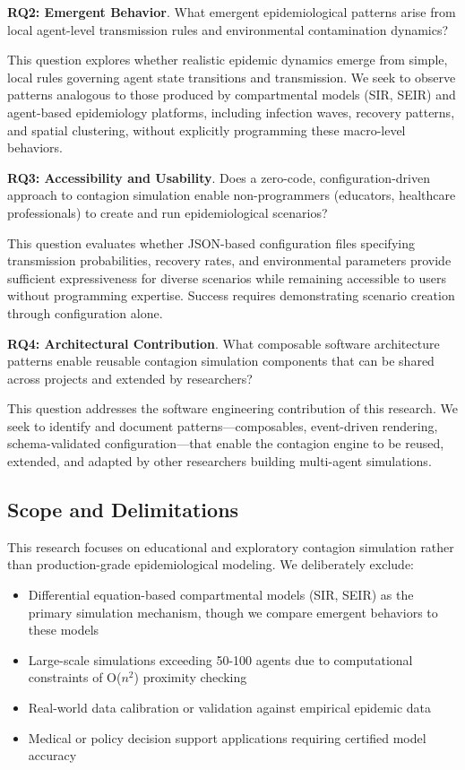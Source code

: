 \textbf{RQ2: Emergent Behavior}. What emergent epidemiological patterns arise from local agent-level transmission rules and environmental contamination dynamics?

This question explores whether realistic epidemic dynamics emerge from simple, local rules governing agent state transitions and transmission. We seek to observe patterns analogous to those produced by compartmental models (SIR, SEIR) and agent-based epidemiology platforms, including infection waves, recovery patterns, and spatial clustering, without explicitly programming these macro-level behaviors.

\textbf{RQ3: Accessibility and Usability}. Does a zero-code, configuration-driven approach to contagion simulation enable non-programmers (educators, healthcare professionals) to create and run epidemiological scenarios?

This question evaluates whether JSON-based configuration files specifying transmission probabilities, recovery rates, and environmental parameters provide sufficient expressiveness for diverse scenarios while remaining accessible to users without programming expertise. Success requires demonstrating scenario creation through configuration alone.

\textbf{RQ4: Architectural Contribution}. What composable software architecture patterns enable reusable contagion simulation components that can be shared across projects and extended by researchers?

This question addresses the software engineering contribution of this research. We seek to identify and document patterns---composables, event-driven rendering, schema-validated configuration---that enable the contagion engine to be reused, extended, and adapted by other researchers building multi-agent simulations.

\subsection{Scope and Delimitations}

This research focuses on educational and exploratory contagion simulation rather than production-grade epidemiological modeling. We deliberately exclude:

\begin{itemize}
    \item Differential equation-based compartmental models (SIR, SEIR) as the primary simulation mechanism, though we compare emergent behaviors to these models
    \item Large-scale simulations exceeding 50-100 agents due to computational constraints of O($n^2$) proximity checking
    \item Real-world data calibration or validation against empirical epidemic data
    \item Medical or policy decision support applications requiring certified model accuracy
\end{itemize}

